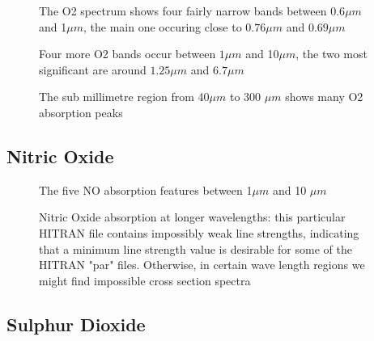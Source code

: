 \documentclass[12pt]{article}
\begin{document}
\vspace*{13.5cm}
\begin{figure}[htb]
\caption{The O2 spectrum shows four fairly narrow bands between $0.6 \mu m$ and 1$\mu m$, the
main one occuring close to $0.76 \mu m$ and $0.69 \mu m$}
\end{figure}
\newpage

\vspace*{11.5cm}
\begin{figure}[htb]
\caption{Four more O2 bands  occur between $1 \mu m$ and 10$\mu m$, the
two most significant are around $1.25 \mu m$ and $6.7 \mu m$}
\end{figure}
\newpage


\vspace*{11.5cm}
\begin{figure}[htb]
\caption{The sub millimetre region from 40$\mu m$ to 300 $\mu m$ shows many O2
absorption peaks }
\end{figure}
\newpage

\subsection{Nitric Oxide}

\vspace*{13.5cm}
\begin{figure}[htb]
\caption{The five NO  absorption features between 1$\mu m$ and 10 $\mu m$}
\end{figure}
\newpage

\vspace*{11.5cm}
\begin{figure}[htb]
\caption{ Nitric Oxide absorption at longer wavelengths: this particular HITRAN file
 contains impossibly weak line strengths, indicating that a minimum line strength value
 is desirable for some of the HITRAN "par" files. Otherwise, in certain wave length regions
we might find impossible cross section spectra}
\end{figure}
\newpage


\subsection{Sulphur Dioxide}
\end{document}
